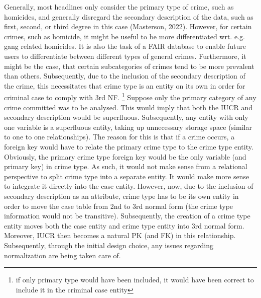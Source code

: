 \documentclass[a4paper]{article}
\begin{document}
Generally, most headlines only consider the primary type of crime, such as homicides, and generally disregard the secondary description of the data, such as first, second, or third degree in this case (Masterson, 2022). However, for certain crimes, such as homicide, it might be useful to be more differentiated wrt. e.g. gang related homicides. It is also the task of a FAIR database to enable future users to differentiate between different types of general crimes. Furthermore, it might be the case, that certain subcategories of crimes tend to be more prevalent than others.
Subsequently, due to the inclusion of the secondary description of the crime, this necessitates that crime type is an entity on its own in order for criminal case to comply with 3rd NF. \footnote{if only primary type would have been included, it would have been correct to include it in the criminal case entity} Suppose only the primary category of any crime committed was to be analysed. This would imply that both the IUCR and secondary description would be superfluous. Subsequently, any entity with only one variable is a superfluous entity, taking up unnecessary storage space (similar to one to one relationships). The reason for this is that if a crime occurs, a foreign key would have to relate the primary crime type to the crime type entity. Obviously, the primary crime type foreign key would be the only variable (and primary key) in crime type. As such, it would not make sense from a relational perspective to split crime type into a separate entity. It would make more sense to integrate it directly into the case entity. However, now, due to the inclusion of secondary description as an attribute, crime type has to be its own entity in order to move the case table from 2nd to 3rd normal form (the crime type information would not be transitive). Subsequently, the creation of a crime type entity moves both the case entity and crime type entity into 3rd normal form. Moreover, IUCR then becomes a natural PK (and FK) in this relationship. Subsequently, through the initial design choice, any issues regarding normalization are being taken care of. 
\end{document}

